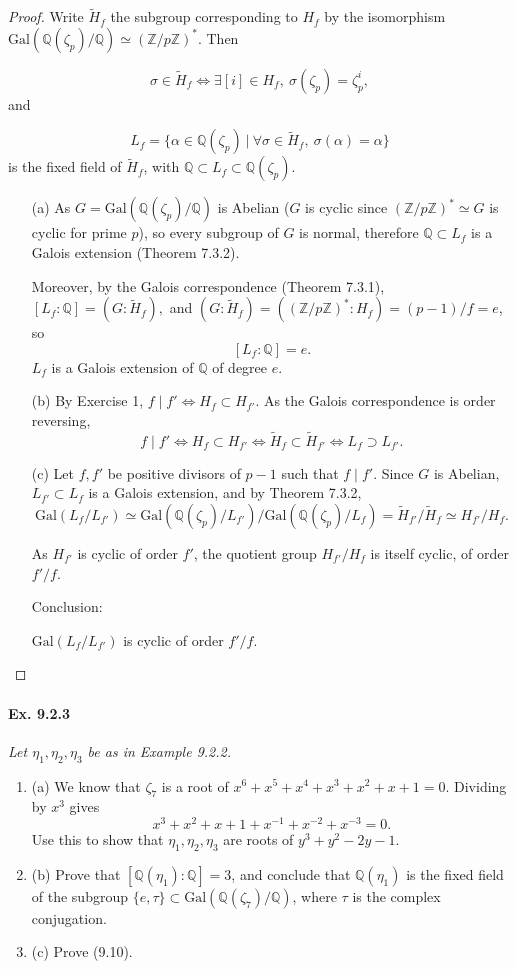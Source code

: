 \documentclass[11pt,a4paper]{article}
\newcommand{\be} {\begin{enumerate}}
\newcommand{\ee} {\end{enumerate}}
\newcommand{\Q}{\mathbb{Q}}
\newcommand{\Z}{\mathbb{Z}}
\newcommand{\Gal}{\mathrm{Gal}}
\begin{document}
\begin{proof}
Write $\tilde{H}_f$ the subgroup corresponding to $H_f$ by the isomorphism $\Gal(\Q(\zeta_p)/\Q) \simeq (\Z/p\Z)^*$. Then

$$\sigma \in \tilde{H}_f \iff \exists [i] \in H_f, \ \sigma(\zeta_p) = \zeta_p^i,$$ and

$$L_f = \{\alpha \in \Q(\zeta_p)\ \vert \ \forall \sigma \in  \tilde{H}_f, \ \sigma(\alpha) = \alpha\}$$
is the fixed field of  $\tilde{H}_f$, with  $ \Q\subset L_f \subset \Q(\zeta_p)$.

\begin{enumerate}
\item[(a)]
As $G = \Gal(\Q(\zeta_p)/\Q)$ is Abelian ($G$ is cyclic since $(\Z/p\Z)^* \simeq G$ is cyclic for prime $p$), so every subgroup of $G$ is normal, therefore  $\Q\subset L_f$ is a Galois extension (Theorem 7.3.2).

 Moreover, by the Galois correspondence (Theorem 7.3.1), $[L_f : \Q] = (G:\tilde{H}_f), $ and $(G:\tilde{H}_f) = ((\Z/p\Z)^* : H_f) = (p-1)/f = e$, so
$$[L_f : \Q]=e.$$
$L_f$ is a Galois extension of $\Q$ of degree $e$.
\item[(b)]
By Exercise 1, $f \mid f' \iff  H_f \subset H_{f'}$. 
As the Galois correspondence is order reversing,
$$f \mid f' \iff  H_f \subset H_{f'} \iff \tilde{H}_f \subset \tilde{H}_{f'} \iff L_f \supset L_{f'}.$$

\item[(c)]
Let $f,f'$ be positive divisors of $p-1$ such that $f \mid f'$. Since $G$ is Abelian,  $L_{f'} \subset L_f$ is a Galois extension, and by Theorem 7.3.2, 
$$\Gal(L_f/L_{f'}) \simeq \Gal(\Q(\zeta_p)/L_{f'}) / \Gal(\Q(\zeta_p)/L_f) = \tilde{H}_{f'} / \tilde{H}_{f} \simeq H_{f'} / H_f.$$

As $H_{f'}$ is cyclic of order $f'$, the quotient group $H_{f'} / H_{f}$ is itself cyclic, of order $f'/f$.

Conclusion:
\begin{center}
$\Gal(L_f/L_{f'})$ is cyclic of order $f'/f$.
\end{center}
\end{enumerate}
\end{proof}

\paragraph{Ex. 9.2.3}

{\it Let $\eta_1,\eta_2,\eta_3$ be as in Example 9.2.2.
\be
\item[(a)] We know that $\zeta_7$ is a root of $x^6+x^5+x^4+x^3+x^2+x+1 = 0$. Dividing by $x^3$ gives
$$x^3+x^2+x+1+x^{-1}+x^{-2}+x^{-3} = 0.$$
Use this to show that $\eta_1,\eta_2,\eta_3$ are roots of $y^3+y^2-2y-1$.
\item[(b)] Prove that $[\Q(\eta_1):\Q] = 3$, and conclude that $\Q(\eta_1)$ is the fixed field of the subgroup $\{e,\tau\} \subset \Gal(\Q(\zeta_7)/\Q)$, where $\tau$ is the complex conjugation.
\item[(c)] Prove (9.10).
\ee}
\end{document}
